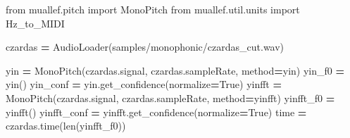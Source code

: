 \documentclass[
  american,
]{article}
\newenvironment{Shaded}{\begin{snugshade}}{\end{snugshade}}
\newcommand{\BuiltInTok}[1]{#1}
\newcommand{\ImportTok}[1]{#1}
\newcommand{\NormalTok}[1]{#1}
\newcommand{\OperatorTok}[1]{\textcolor[rgb]{0.81,0.36,0.00}{\textbf{#1}}}
\newcommand{\StringTok}[1]{\textcolor[rgb]{0.31,0.60,0.02}{#1}}
\newcommand{\VariableTok}[1]{\textcolor[rgb]{0.00,0.00,0.00}{#1}}
\begin{document}
\begin{Shaded}
\begin{Highlighting}[]
\ImportTok{from}\NormalTok{ muallef.pitch }\ImportTok{import}\NormalTok{ MonoPitch}
\ImportTok{from}\NormalTok{ muallef.util.units }\ImportTok{import}\NormalTok{ Hz\_to\_MIDI}

\NormalTok{czardas }\OperatorTok{=}\NormalTok{ AudioLoader(}\StringTok{\textquotesingle{}samples/monophonic/czardas\_cut.wav\textquotesingle{}}\NormalTok{)}

\NormalTok{yin }\OperatorTok{=}\NormalTok{ MonoPitch(czardas.signal, czardas.sampleRate, method}\OperatorTok{=}\StringTok{\textquotesingle{}yin\textquotesingle{}}\NormalTok{)}
\NormalTok{yin\_f0 }\OperatorTok{=}\NormalTok{ yin()}
\NormalTok{yin\_conf }\OperatorTok{=}\NormalTok{ yin.get\_confidence(normalize}\OperatorTok{=}\VariableTok{True}\NormalTok{)}
\NormalTok{yinfft }\OperatorTok{=}\NormalTok{ MonoPitch(czardas.signal, czardas.sampleRate, method}\OperatorTok{=}\StringTok{\textquotesingle{}yinfft\textquotesingle{}}\NormalTok{)}
\NormalTok{yinfft\_f0 }\OperatorTok{=}\NormalTok{ yinfft()}
\NormalTok{yinfft\_conf }\OperatorTok{=}\NormalTok{ yinfft.get\_confidence(normalize}\OperatorTok{=}\VariableTok{True}\NormalTok{)}
\NormalTok{time }\OperatorTok{=}\NormalTok{ czardas.time(}\BuiltInTok{len}\NormalTok{(yinfft\_f0))}


\end{Highlighting}
\end{Shaded}
\end{document}
